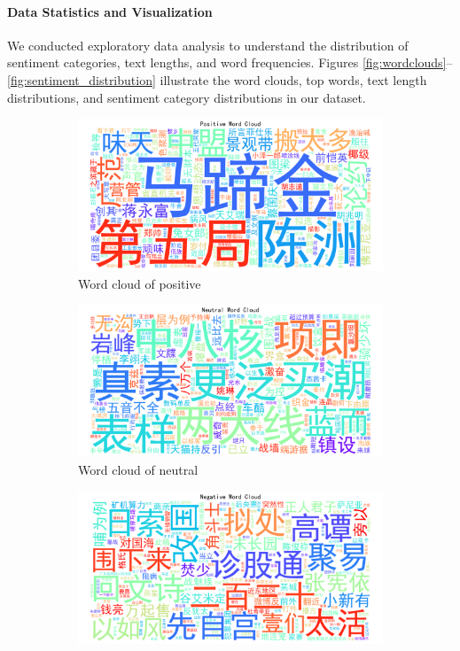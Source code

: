 \documentclass[12pt]{article}
\begin{document}
\paragraph{Data Statistics and Visualization}
We conducted exploratory data analysis to understand the distribution of sentiment categories, text lengths, and word frequencies. Figures \ref{fig:wordclouds}--\ref{fig:sentiment_distribution} illustrate the word clouds, top words, text length distributions, and sentiment category distributions in our dataset.

\begin{figure}[!ht]
	\centering
	\begin{subfigure}[b]{0.32\textwidth}
		\includegraphics[width=\linewidth]{wordcloud_positive.png}
		\caption{Word cloud of positive}
	\end{subfigure}
	\hfill
	\begin{subfigure}[b]{0.32\textwidth}
		\includegraphics[width=\linewidth]{wordcloud_neutral.png}
		\caption{Word cloud of neutral}
	\end{subfigure}
	\hfill
	\begin{subfigure}[b]{0.32\textwidth}
		\includegraphics[width=\linewidth]{wordcloud_negative.png}

\end{subfigure}
\end{figure}
\end{document}
